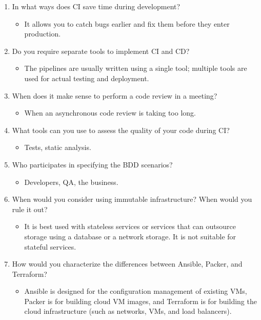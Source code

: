 \begin{enumerate}
\item
In what ways does CI save time during development?
\begin{itemize}
\item 
It allows you to catch bugs earlier and fix them before they enter production.
\end{itemize}

\item
Do you require separate tools to implement CI and CD?
\begin{itemize}
\item 
The pipelines are usually written using a single tool; multiple tools are used for actual testing and deployment.
\end{itemize}

\item
When does it make sense to perform a code review in a meeting?
\begin{itemize}
\item 
When an asynchronous code review is taking too long.
\end{itemize}

\item
What tools can you use to assess the quality of your code during CI?
\begin{itemize}
\item 
Tests, static analysis.
\end{itemize}

\item
Who participates in specifying the BDD scenarios?
\begin{itemize}
\item 
Developers, QA, the business.
\end{itemize}

\item
When would you consider using immutable infrastructure? When would you rule it out?
\begin{itemize}
\item 
It is best used with stateless services or services that can outsource storage using a database or a network storage. It is not suitable for stateful services.
\end{itemize}

\item
How would you characterize the differences between Ansible, Packer, and Terraform?
\begin{itemize}
\item 
Ansible is designed for the configuration management of existing VMs, Packer is for building cloud VM images, and Terraform is for building the cloud infrastructure (such as networks, VMs, and load balancers).
\end{itemize}
\end{enumerate}